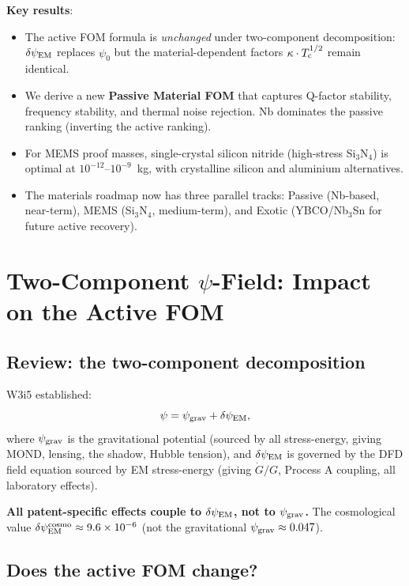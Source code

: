 \documentclass[11pt]{article}
\theoremstyle{definition}
\theoremstyle{remark}
\newcommand{\ee}[1]{\times 10^{#1}}
\newcommand{\psigrav}{\psi_{\rm grav}}
\newcommand{\psiEM}{\delta\psi_{\rm EM}}
\newcommand{\Tc}{T_{\rm c}}
\begin{document}
\noindent\textbf{Key results}:
\begin{itemize}[nosep]
  \item The active FOM formula is \emph{unchanged} under two-component
    decomposition: $\psiEM$ replaces $\psi_0$ but the material-dependent
    factors $\kappa\cdot\Tc^{1/2}$ remain identical.
  \item We derive a new \textbf{Passive Material FOM} that captures
    Q-factor stability, frequency stability, and thermal noise rejection.
    Nb dominates the passive ranking (inverting the active ranking).
  \item For MEMS proof masses, single-crystal silicon nitride (high-stress
    Si$_3$N$_4$) is optimal at $10^{-12}$--$10^{-9}$~kg, with
    crystalline silicon and aluminium alternatives.
  \item The materials roadmap now has three parallel tracks: Passive
    (Nb-based, near-term), MEMS (Si$_3$N$_4$, medium-term), and
    Exotic (YBCO/Nb$_3$Sn for future active recovery).
\end{itemize}


\section{Two-Component $\psi$-Field: Impact on the Active FOM}
\label{sec:two-component-fom}

\subsection{Review: the two-component decomposition}

W3i5 established:
\begin{equation}
  \psi = \psigrav + \psiEM,
\end{equation}
where $\psigrav$ is the gravitational potential (sourced by all
stress-energy, giving MOND, lensing, the shadow, Hubble tension),
and $\psiEM$ is governed by the DFD field equation sourced by EM
stress-energy (giving $\dot{G}/G$, Process A coupling, all laboratory
effects).

\textbf{All patent-specific effects couple to $\psiEM$, not to $\psigrav$.}
The cosmological value $\psiEM^{\rm cosmo} \approx 9.6\ee{-6}$ (not the
gravitational $\psigrav \approx 0.047$).

\subsection{Does the active FOM change?}
\end{document}
